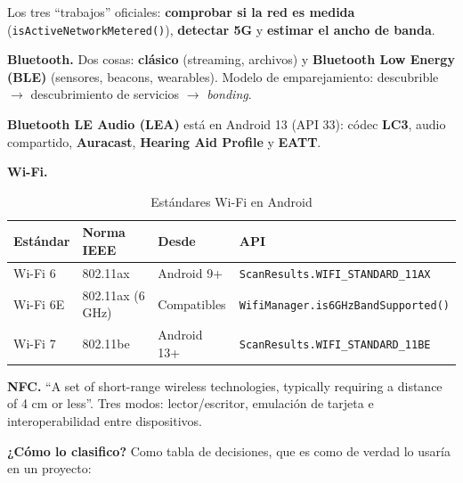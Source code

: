 \documentclass[11pt,a4paper]{article}
\newcommand{\code}[1]{\texttt{\color{ink}#1}}
\newcommand{\campo}[1]{\textbf{\color{ink}#1}}
\begin{document}
	Los tres \enquote{trabajos} oficiales: \textbf{comprobar si la red es medida} (\code{isActiveNetworkMetered()}), \textbf{detectar 5G} y \textbf{estimar el ancho de banda}.
	
	\textbf{Bluetooth.} Dos cosas: \textbf{clásico} (streaming, archivos) y \textbf{Bluetooth Low Energy (BLE)} (sensores, beacons, wearables). Modelo de emparejamiento: descubrible $\to$ descubrimiento de servicios $\to$ \emph{bonding}.
	
	\textbf{Bluetooth LE Audio (LEA)} está en Android 13 (API 33): códec \textbf{LC3}, audio compartido, \textbf{Auracast}, \textbf{Hearing Aid Profile} y \textbf{EATT}.
	
	\textbf{Wi-Fi.}
	
	\begin{table}[htbp]
		\centering
		\small
		\begin{tabular}{@{}l l l l@{}}
			\toprule
			\rowcolor{primary}
			\textcolor{paper}{\sffamily\bfseries Estándar} & \textcolor{paper}{\sffamily\bfseries Norma IEEE} & \textcolor{paper}{\sffamily\bfseries Desde} & \textcolor{paper}{\sffamily\bfseries API} \\
			\midrule
			Wi-Fi 6 & 802.11ax & Android 9+ & \code{ScanResults.WIFI\_STANDARD\_11AX} \\
			\rowcolor{soft}
			Wi-Fi 6E & 802.11ax (6 GHz) & Compatibles & \code{WifiManager.is6GHzBandSupported()} \\
			Wi-Fi 7 & 802.11be & Android 13+ & \code{ScanResults.WIFI\_STANDARD\_11BE} \\
			\bottomrule
		\end{tabular}
		\caption{Estándares Wi-Fi en Android}
	\end{table}
	
	\textbf{NFC.} \enquote{A set of short-range wireless technologies, typically requiring a distance of 4 cm or less}. Tres modos: lector/escritor, emulación de tarjeta e interoperabilidad entre dispositivos.
	
	\campo{¿Cómo lo clasifico?} Como tabla de decisiones, que es como de verdad lo usaría en un proyecto:
	
\end{document}
